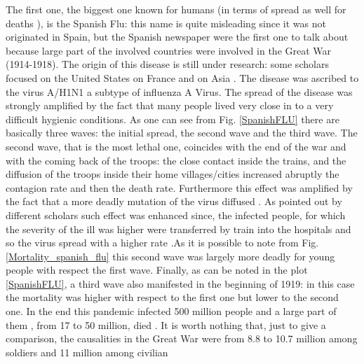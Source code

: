 \documentclass[
12pt, %
a4paper, %
oneside, %
headinclude,footinclude, %
BCOR5mm, %
]{scrartcl}
\begin{document}
 The first one, the biggest one known for humans (in terms of spread as well for deaths \cite{potter2001history} ), is the Spanish Flu: this name is quite misleading since it was not originated in Spain, but the Spanish newspaper were the first one to talk about because large part of the involved countries were involved in the Great War (1914-1918). The origin of this disease is still under research: some scholars focused on the  United States \cite{crosby_2003,barry2004site}on France \cite{shanks2016no} and on Asia \cite{langford2005did}.  The disease was ascribed to the virus A/H1N1 a subtype of influenza A Virus. The spread of the disease was strongly amplified by the fact that many people lived very close in to a very difficult hygienic conditions. As one can see from Fig. \ref{SpanishFLU} there are basically three waves: the initial spread, the second wave and the third wave. The second wave, that is the most lethal one, coincides with the end of the war and with the coming back of the troops: the close contact inside the trains, and the diffusion of the troops inside their home villages/cities increased abruptly the contagion rate and then the death rate. Furthermore this effect was amplified by the fact that a more deadly mutation of the virus diffused  \cite{barry2008cross}. As pointed out by different scholars such effect was enhanced since, the infected people, for which the severity of the ill was higher were transferred by train  into the hospitals and so  the virus spread with a higher rate \cite{wever2014death}.As it is possible to note from Fig. \ref{Mortality_spanish_flu} this second wave was largely more deadly for young people with respect the first wave. Finally, as can be noted in the plot \ref{SpanishFLU}, a third wave also manifested in the beginning of 1919: in this case the mortality was higher with respect to the first one but lower to the second one. In the end this pandemic infected 500 million people and a large part of them , from 17 to 50 million, died \cite{spreeuwenberg2018reassessing}. It is worth nothing that, just to give a comparison, the causalities in the Great War were from 8.8 to 10.7 million among soldiers and 11 million among civilian \cite{haythornthwaite1996world}
\end{document}
